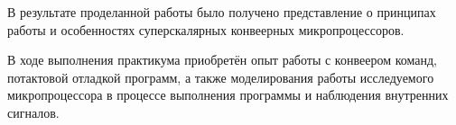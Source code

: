 \Conclusion

В результате проделанной работы было получено представление о принципах работы и особенностях суперскалярных конвеерных микропроцессоров. 

В ходе выполнения практикума приобретён опыт работы с конвеером команд, потактовой отладкой программ, а также моделирования работы исследуемого микропроцессора в процессе выполнения программы и наблюдения внутренних сигналов.
